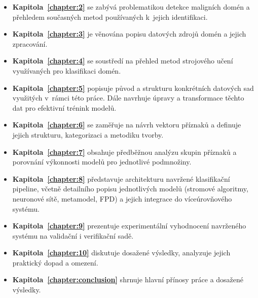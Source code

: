 \begin{itemize}
    \item \textbf{Kapitola~\ref{chapter:2}} se zabývá problematikou detekce maligních domén a přehledem současných metod používaných k~jejich identifikaci. 
    
    \item \textbf{Kapitola~\ref{chapter:3}} je věnována popisu datových zdrojů domén a jejich zpracování. 

    \item \textbf{Kapitola~\ref{chapter:4}} se soustředí na přehled metod strojového učení využívaných pro klasifikaci domén. 

    \item \textbf{Kapitola~\ref{chapter:5}} popisuje původ a strukturu konkrétních datových sad využitých v~rámci této práce. Dále navrhuje úpravy a transformace těchto dat pro efektivní trénink modelů.

    \item \textbf{Kapitola~\ref{chapter:6}} se zaměřuje na návrh vektoru příznaků a definuje jejich strukturu, kategorizaci a metodiku tvorby. 

    \item \textbf{Kapitola~\ref{chapter:7}} obsahuje předběžnou analýzu skupin příznaků a porovnání výkonnosti modelů pro jednotlivé podmnožiny. 

    \item \textbf{Kapitola~\ref{chapter:8}} představuje architekturu navržené klasifikační pipeline, včetně detailního popisu jednotlivých modelů (stromové algoritmy, neuronové sítě, metamodel, FPD) a jejich integrace do víceúrovňového systému.

    \item \textbf{Kapitola~\ref{chapter:9}} prezentuje experimentální vyhodnocení navrženého systému na validační i verifikační sadě. 

    \item \textbf{Kapitola~\ref{chapter:10}} diskutuje dosažené výsledky, analyzuje jejich praktický dopad a omezení.

    \item \textbf{Kapitola~\ref{chapter:conclusion}} shrnuje hlavní přínosy práce a dosažené výsledky.








\end{itemize}









